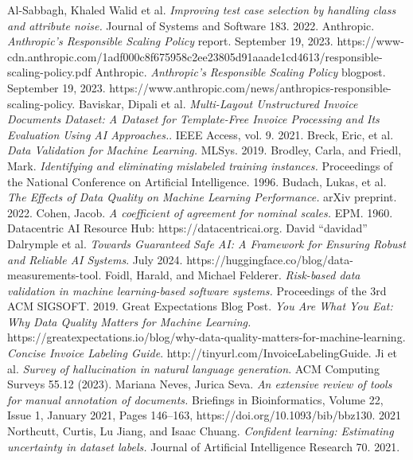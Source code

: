 \documentclass[twocolumn]{article}
\begin{document}
\iffalse


\begin{thebibliography}{10}
\footnotesize
{} Al-Sabbagh, Khaled Walid et al. {\em Improving test case selection by handling class and attribute noise.} Journal of Systems and Software 183. 2022.
 Anthropic. {\em Anthropic's Responsible Scaling Policy} report. September 19, 2023. https://www-cdn.anthropic.com/1adf000c8f675958c2ee23805d91aaade1cd4613/responsible-scaling-policy.pdf
 Anthropic. {\em Anthropic's Responsible Scaling Policy} blogpost. September 19, 2023. https://www.anthropic.com/news/anthropics-responsible-scaling-policy.
 Baviskar, Dipali et al. {\em Multi-Layout Unstructured Invoice Documents Dataset: A Dataset for Template-Free Invoice Processing and Its Evaluation Using AI Approaches.}. IEEE Access, vol. 9. 2021.
 Breck, Eric, et al. {\em Data Validation for Machine Learning.} MLSys. 2019.
 Brodley, Carla, and Friedl, Mark. {\em Identifying and eliminating mislabeled training instances.} Proceedings of the National Conference on Artificial Intelligence. 1996.
 Budach, Lukas, et al. {\em The Effects of Data Quality on Machine Learning Performance.} arXiv preprint. 2022.
 Cohen, Jacob. {\em A coefficient of agreement for nominal scales.} EPM. 1960.
 Datacentric AI Resource Hub: https://datacentricai.org.
 David ``davidad'' Dalrymple et al. {\em Towards Guaranteed Safe AI: A Framework for Ensuring Robust and Reliable AI Systems}. July 2024.
 https://huggingface.co/blog/data-measurements-tool. 
 Foidl, Harald, and Michael Felderer. {\em Risk-based data validation in machine learning-based software systems.} Proceedings of the 3rd ACM SIGSOFT. 2019.
 Great Expectations Blog Post. {\em You Are What You Eat: Why Data Quality Matters for Machine Learning.} https://greatexpectations.io/blog/why-data-quality-matters-for-machine-learning. 
 {\em Concise Invoice Labeling Guide}. http://tinyurl.com/InvoiceLabelingGuide. 
 Ji et al. {\em Survey of hallucination in natural language generation}. ACM Computing Surveys 55.12 (2023).
 Mariana Neves, Jurica Seva. {\em An extensive review of tools for manual annotation of documents.} Briefings in Bioinformatics, Volume 22, Issue 1, January 2021, Pages 146–163, https://doi.org/10.1093/bib/bbz130. 2021
 Northcutt, Curtis, Lu Jiang, and Isaac Chuang. {\em Confident learning: Estimating uncertainty in dataset labels.} Journal of Artificial Intelligence Research 70. 2021.

\end{thebibliography}
\end{document}
